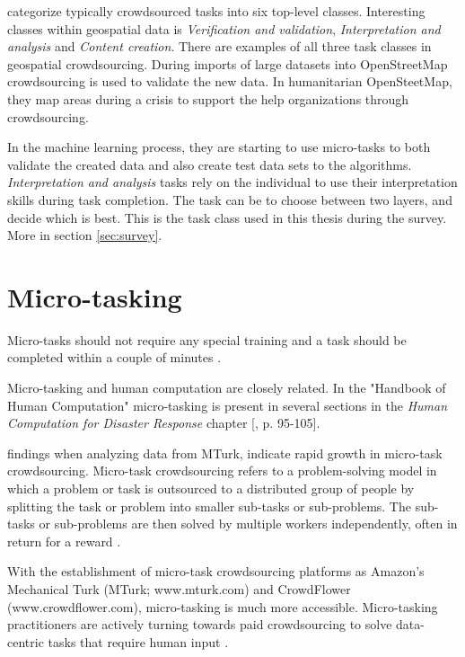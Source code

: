 \cite{Gadiraju2015} categorize typically crowdsourced tasks into six top-level classes. Interesting classes within geospatial data is \textit{Verification and validation}, \textit{Interpretation and analysis} and \textit{Content creation}. There are examples of all three task classes in geospatial crowdsourcing. During imports of large datasets into OpenStreetMap crowdsourcing is used to validate the new data. In humanitarian OpenSteetMap, they map areas during a crisis to support the help organizations through crowdsourcing. 

In the machine learning process, they are starting to use micro-tasks to both validate the created data and also create test data sets to the algorithms. \textit{Interpretation and analysis} tasks rely on the individual to use their interpretation skills during task completion. The task can be to choose between two layers, and decide which is best. This is the task class used in this thesis during the survey. More in section \ref{sec:survey}.

\section{Micro-tasking}\label{sec:microtasking}

Micro-tasks should not require any special training and a task should be completed within a couple of minutes \citep{Ipeirotis2010}.  

Micro-tasking and human computation are closely related. In the "Handbook of Human Computation" micro-tasking is present in several sections in the \textit{Human Computation for Disaster Response} chapter [\citep{Meier2013}, p. 95-105].  

\cite{Gadiraju2015} findings when analyzing data from MTurk, indicate rapid growth in micro-task crowdsourcing. Micro-task crowdsourcing refers to a problem-solving model in which a problem or task is outsourced to a distributed group of people by splitting the task or problem into smaller sub-tasks or sub-problems. The sub-tasks or sub-problems are then solved by multiple workers independently, often in return for a reward \citep{Sarasua2012}. 

With the establishment of micro-task crowdsourcing platforms as Amazon's Mechanical Turk (MTurk; www.mturk.com) and CrowdFlower (www.crowdflower.com), micro-tasking is much more accessible. Micro-tasking practitioners are actively turning towards paid crowdsourcing to solve data-centric tasks that require human input \citep{Gadiraju2015}. 

